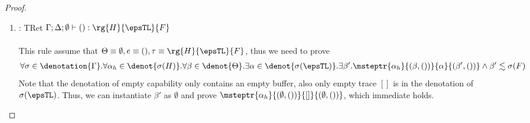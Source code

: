 \begin{proof}
\begin{enumerate}[label=Case]
{\begin{alignat}{2}
\end{alignat}}\noindent
With help of hypothesis \ref{real:1-10} and \ref{real:1-11}, we can instantiate the existential quantified variables as $\beta \mapsto \{ \zevent{op}{\overline{\sigma(v_i)}} \}\cup \beta, \alpha \mapsto [\zevent{op}{\overline{\sigma(v_i)}}] \listconcat \alpha$, and we need to prove
{\footnotesize\begin{align*}
    \msteptr{\alpha_h}{(\beta, \zgen{op}{\overline{v}}{e})}{[\zevent{op}{\overline{\sigma(v_i)}}] \listconcat \alpha}{(\beta', ())}
\end{align*}}\noindent
where
{\footnotesize\begin{alignat}{2}
& \alpha_h \vDash \zevent{op}{\overline{c}} \Downarrow \beta_{\eff{op}} \ptag{hypothesis \ref{real:2-8}} \label{real:1-12}
\\& \msteptr{\alpha_h}{(\beta \cup \beta_{\eff{op}}, e)}{\alpha}{(\beta', ())} \ptag{hypothesis \ref{real:1-10}} \label{real:1-13}
\\& \msteptr{\alpha_h}{(\beta, \zgen{op}{\overline{v}}{e})}{ [\zevent{op}{\overline{\sigma(v_i)}}] \listconcat \alpha}{(\beta', ())} \ptag{\textsc{StGen}, \ref{real:1-12}, and \ref{real:1-13}} \label{real:1-14}
\end{alignat}}\noindent
which is sufficient to prove the subgoal in this case.

\item:
{\footnotesize
\mprooftr{35mm}
{}
{TRet}
{$\Gamma; \Delta; \emptyset \vdash () : \rg{H}{\epsTL}{F}$}
\ \\ \ \\}
This rule assume that $\Theta \equiv \emptyset, e \equiv (), \tau \equiv \rg{H}{\epsTL}{F}$, thus we need to prove
{\footnotesize\begin{align*}
\forall \sigma \in
    \denotation{\Gamma}. \forall \alpha_h \in \denot{\sigma(H)}.\forall \beta \in \denot{\Theta}. \exists \alpha \in \denot{\sigma(\epsTL)}.\exists \beta'. \msteptr{\alpha_h}{(\beta, ())}{\alpha}{(\beta', ())} \land \beta' \realz \sigma(F)
\end{align*}}\noindent
Note that the denotation of empty capability only contains an empty buffer, also only empty trace $[]$ is in the denotation of $\sigma(\epsTL)$. Thus, we can instantiate $\beta'$ as $\emptyset$ and prove $\msteptr{\alpha_h}{(\emptyset, ())}{[]}{(\emptyset, ())}$, which immediate holds.


\end{enumerate}
\end{proof}
